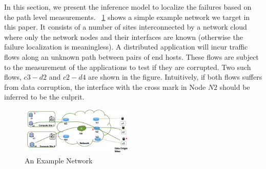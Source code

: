 In this section, we present the inference model to localize the failures based on the path level measurements. ~\ref{fig:example} shows a simple example network we target in this paper. It consists of a number of sites interconnected by a network cloud 
where only the network nodes and their interfaces are known (otherwise the failure localization is meaningless). 
A distributed application will incur traffic flows along an unknown path between pairs of end hosts. These flows are subject to 
the measurement of the applications to test if they are corrupted. Two such flows, $c3-d2$ and $c2-d4$ are shown in the figure. Intuitively, 
if both flows suffers from data corruption, the interface with the cross mark in Node $N2$ should be inferred to be the culprit.   

\begin{figure}
  \begin{center}
    \includegraphics[width=0.48\textwidth]{./figure/example_network.png}
  \end{center}
\caption{An Example Network}
\label{fig:example}
\end{figure}

